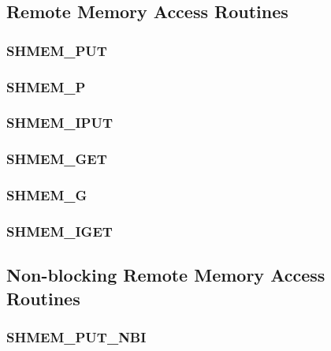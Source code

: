 \documentclass[10pt]{book}
\begin{document}
\subsection{Remote Memory Access Routines}\label{sec:rma}


\subsubsection{\textbf{SHMEM\_PUT}}\label{subsec:shmem_put}


\subsubsection{\textbf{SHMEM\_P}}\label{subsec:shmem_p}


\subsubsection{\textbf{SHMEM\_IPUT}}\label{subsec:shmem_iput}


\subsubsection{\textbf{SHMEM\_GET}}\label{subsec:shmem_get}


\subsubsection{\textbf{SHMEM\_G}}\label{subsec:shmem_g}


\subsubsection{\textbf{SHMEM\_IGET}}\label{subsec:shmem_iget}



\subsection{Non-blocking Remote Memory Access Routines}\label{sec:rma_nbi}

\subsubsection{\textbf{SHMEM\_PUT\_NBI}}\label{subsec:shmem_put_nbi}

\end{document}
